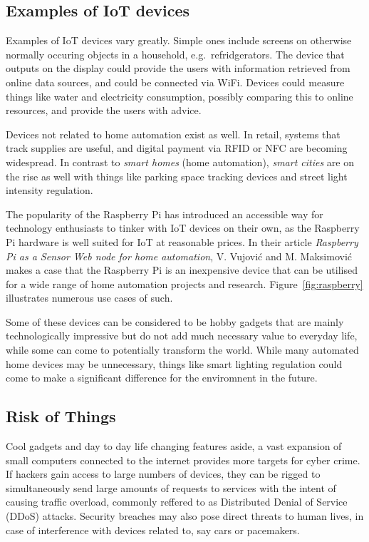 \documentclass[a4paper, conference]{IEEEtran/IEEEtran}
\begin{document}
\subsection{Examples of IoT devices}
Examples of IoT devices vary greatly. Simple ones include screens on otherwise normally occuring objects in a household, e.g.\ refridgerators. The device that outputs on the display could provide the users with information retrieved from online data sources, and could be connected via WiFi. Devices could measure things like water and electricity consumption, possibly comparing this to online resources, and provide the users with advice.

Devices not related to home automation exist as well. In retail, systems that track supplies are useful, and digital payment via RFID or NFC are becoming widespread. In contrast to \textit{smart homes} (home automation), \textit{smart cities} are on the rise as well with things like parking space tracking devices\cite{parking} and street light intensity regulation.  

The popularity of the Raspberry Pi has introduced an accessible way for technology enthusiasts to tinker with IoT devices on their own, as the Raspberry Pi hardware is well suited for IoT at reasonable prices.\cite{raspberryiot} In their article \textit{Raspberry Pi as a Sensor Web node for home automation}, V. Vujović and M. Maksimović makes a case that the Raspberry Pi is an inexpensive device that can be utilised for a wide range of home automation projects and research.\cite{raspberrysensor} Figure~\ref{fig:raspberry} illustrates numerous use cases of such.

Some of these devices can be considered to be hobby gadgets that are mainly technologically impressive but do not add much necessary value to everyday life, while some can come to potentially transform the world. While many automated home devices may be unnecessary, things like smart lighting regulation could come to make a significant difference for the enviromnent in the future.\cite{meola}

\subsection{Risk of Things}
Cool gadgets and day to day life changing features aside, a vast expansion of small computers connected to the internet provides more targets for cyber crime. If hackers gain access to large numbers of devices, they can be rigged to simultaneously send large amounts of requests to services with the intent of causing traffic overload, commonly reffered to as Distributed Denial of Service (DDoS) attacks.\cite{ddos} Security breaches may also pose direct threats to human lives, in case of interference with devices related to, say cars or pacemakers.\cite{windriver}
\end{document}

